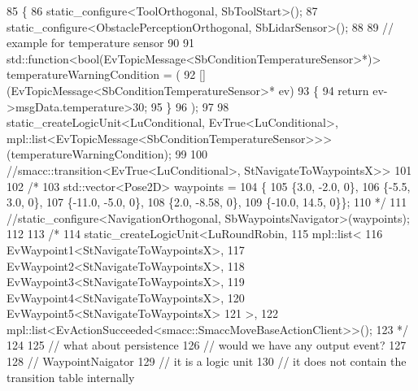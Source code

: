 \begin{DoxyCode}
85   \{
86     static\_configure<ToolOrthogonal, SbToolStart>();
87     static\_configure<ObstaclePerceptionOrthogonal, SbLidarSensor>();
88 
89     \textcolor{comment}{// example for temperature sensor}
90     
91     std::function<bool(EvTopicMessage<SbConditionTemperatureSensor>*)> temperatureWarningCondition = (
92                           [](EvTopicMessage<SbConditionTemperatureSensor>* ev)
93                           \{
94                             \textcolor{keywordflow}{return} ev->msgData.temperature>30;
95                           \}
96                         );
97 
98     static\_createLogicUnit<LuConditional, EvTrue<LuConditional>, 
      mpl::list<EvTopicMessage<SbConditionTemperatureSensor>>>(temperatureWarningCondition);
99 
100     \textcolor{comment}{//smacc::transition<EvTrue<LuConditional>, StNavigateToWaypointsX>>}
101 
102     \textcolor{comment}{/*}
103 \textcolor{comment}{    std::vector<Pose2D> waypoints =}
104 \textcolor{comment}{        \{}
105 \textcolor{comment}{            \{3.0, -2.0, 0\},}
106 \textcolor{comment}{            \{-5.5, 3.0, 0\},}
107 \textcolor{comment}{            \{-11.0, -5.0, 0\},}
108 \textcolor{comment}{            \{2.0, -8.58, 0\},}
109 \textcolor{comment}{            \{-10.0, 14.5, 0\}\};}
110 \textcolor{comment}{*/}
111     \textcolor{comment}{//static\_configure<NavigationOrthogonal, SbWaypointsNavigator>(waypoints);}
112 
113     \textcolor{comment}{/*}
114 \textcolor{comment}{    static\_createLogicUnit<LuRoundRobin, }
115 \textcolor{comment}{                              mpl::list<}
116 \textcolor{comment}{                                   EvWaypoint1<StNavigateToWaypointsX>,}
117 \textcolor{comment}{                                   EvWaypoint2<StNavigateToWaypointsX>,}
118 \textcolor{comment}{                                   EvWaypoint3<StNavigateToWaypointsX>, }
119 \textcolor{comment}{                                   EvWaypoint4<StNavigateToWaypointsX>,}
120 \textcolor{comment}{                                   EvWaypoint5<StNavigateToWaypointsX>}
121 \textcolor{comment}{                                  >, }
122 \textcolor{comment}{                         mpl::list<EvActionSucceeded<smacc::SmaccMoveBaseActionClient>>();}
123 \textcolor{comment}{                         */}
124 
125     \textcolor{comment}{// what about persistence}
126     \textcolor{comment}{// would we have any output event?}
127 
128     \textcolor{comment}{// WaypointNaigator}
129     \textcolor{comment}{// it is a logic unit}
130     \textcolor{comment}{// it does not contain the transition table internally}

\end{DoxyCode}
